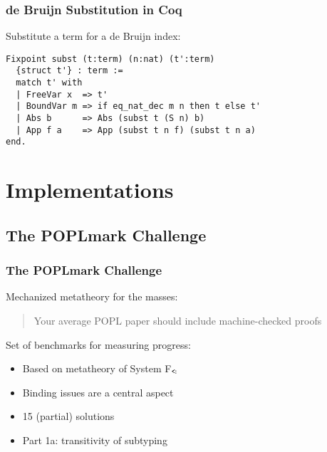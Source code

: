 \documentclass[notheorems]{beamer}
\begin{document}
\begin{frame}[fragile]

  \frametitle{de Bruijn Substitution in Coq}

  Substitute a term for a de Bruijn index:
  \begin{lstlisting}
Fixpoint subst (t:term) (n:nat) (t':term)
  {struct t'} : term :=
  match t' with
  | FreeVar x  => t'
  | BoundVar m => if eq_nat_dec m n then t else t'
  | Abs b      => Abs (subst t (S n) b)
  | App f a    => App (subst t n f) (subst t n a)
end.
  \end{lstlisting}

\end{frame}


\section{Implementations}


\subsection{The POPLmark Challenge}




\begin{frame}

  \frametitle{The POPLmark Challenge}

  Mechanized metatheory for the masses:
  \begin{quote}
    Your average POPL paper should include machine-checked proofs
  \end{quote}

  Set of benchmarks for measuring progress:
  \begin{itemize}
    \item Based on metatheory of System F$_\texttt{<\!:}$
    \item Binding issues are a central aspect
    \item 15 (partial) solutions
    \item Part 1a: transitivity of subtyping
  \end{itemize}

\end{frame}
\end{document}

